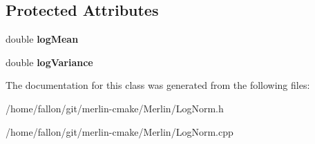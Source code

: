 \subsection*{Protected Attributes}
\begin{DoxyCompactItemize}
\item 
\mbox{\label{classLogNormal_ae1b1f5cf34efe304a3b8ea5f5c07927a}} 
double {\bfseries log\+Mean}
\item 
\mbox{\label{classLogNormal_a2fbafbeceddb8e0cd0dfe95be66512dc}} 
double {\bfseries log\+Variance}
\end{DoxyCompactItemize}


The documentation for this class was generated from the following files\+:\begin{DoxyCompactItemize}
\item 
/home/fallon/git/merlin-\/cmake/\+Merlin/Log\+Norm.\+h\item 
/home/fallon/git/merlin-\/cmake/\+Merlin/Log\+Norm.\+cpp\end{DoxyCompactItemize}
